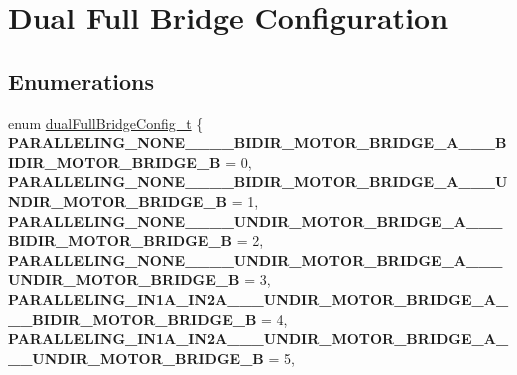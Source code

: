\hypertarget{group___dual___full___bridge___configuration}{}\section{Dual Full Bridge Configuration}
\label{group___dual___full___bridge___configuration}
\subsection*{Enumerations}
\begin{DoxyCompactItemize}
\item 
\mbox{\label{group___dual___full___bridge___configuration_gab5810188b32c0f4c04abcbf058f09722}} 
enum \mbox{\hyperlink{group___dual___full___bridge___configuration_gab5810188b32c0f4c04abcbf058f09722}{dual\+Full\+Bridge\+Config\+\_\+t}} \{ \newline
{\bfseries P\+A\+R\+A\+L\+L\+E\+L\+I\+N\+G\+\_\+\+N\+O\+N\+E\+\_\+\+\_\+\+\_\+\_\+\+B\+I\+D\+I\+R\+\_\+\+M\+O\+T\+O\+R\+\_\+\+B\+R\+I\+D\+G\+E\+\_\+\+A\+\_\+\+\_\+\_\+\+B\+I\+D\+I\+R\+\_\+\+M\+O\+T\+O\+R\+\_\+\+B\+R\+I\+D\+G\+E\+\_\+B} = 0, 
{\bfseries P\+A\+R\+A\+L\+L\+E\+L\+I\+N\+G\+\_\+\+N\+O\+N\+E\+\_\+\+\_\+\+\_\+\_\+\+B\+I\+D\+I\+R\+\_\+\+M\+O\+T\+O\+R\+\_\+\+B\+R\+I\+D\+G\+E\+\_\+\+A\+\_\+\+\_\+\_\+\+U\+N\+D\+I\+R\+\_\+\+M\+O\+T\+O\+R\+\_\+\+B\+R\+I\+D\+G\+E\+\_\+B} = 1, 
{\bfseries P\+A\+R\+A\+L\+L\+E\+L\+I\+N\+G\+\_\+\+N\+O\+N\+E\+\_\+\+\_\+\+\_\+\_\+\+U\+N\+D\+I\+R\+\_\+\+M\+O\+T\+O\+R\+\_\+\+B\+R\+I\+D\+G\+E\+\_\+\+A\+\_\+\+\_\+\_\+\+B\+I\+D\+I\+R\+\_\+\+M\+O\+T\+O\+R\+\_\+\+B\+R\+I\+D\+G\+E\+\_\+B} = 2, 
{\bfseries P\+A\+R\+A\+L\+L\+E\+L\+I\+N\+G\+\_\+\+N\+O\+N\+E\+\_\+\+\_\+\+\_\+\_\+\+U\+N\+D\+I\+R\+\_\+\+M\+O\+T\+O\+R\+\_\+\+B\+R\+I\+D\+G\+E\+\_\+\+A\+\_\+\+\_\+\_\+\+U\+N\+D\+I\+R\+\_\+\+M\+O\+T\+O\+R\+\_\+\+B\+R\+I\+D\+G\+E\+\_\+B} = 3, 
\newline
{\bfseries P\+A\+R\+A\+L\+L\+E\+L\+I\+N\+G\+\_\+\+I\+N1\+A\+\_\+\+I\+N2\+A\+\_\+\+\_\+\_\+\+U\+N\+D\+I\+R\+\_\+\+M\+O\+T\+O\+R\+\_\+\+B\+R\+I\+D\+G\+E\+\_\+\+A\+\_\+\+\_\+\_\+\+B\+I\+D\+I\+R\+\_\+\+M\+O\+T\+O\+R\+\_\+\+B\+R\+I\+D\+G\+E\+\_\+B} = 4, 
{\bfseries P\+A\+R\+A\+L\+L\+E\+L\+I\+N\+G\+\_\+\+I\+N1\+A\+\_\+\+I\+N2\+A\+\_\+\+\_\+\_\+\+U\+N\+D\+I\+R\+\_\+\+M\+O\+T\+O\+R\+\_\+\+B\+R\+I\+D\+G\+E\+\_\+\+A\+\_\+\+\_\+\_\+\+U\+N\+D\+I\+R\+\_\+\+M\+O\+T\+O\+R\+\_\+\+B\+R\+I\+D\+G\+E\+\_\+B} = 5, 

\end{DoxyCompactItemize}
